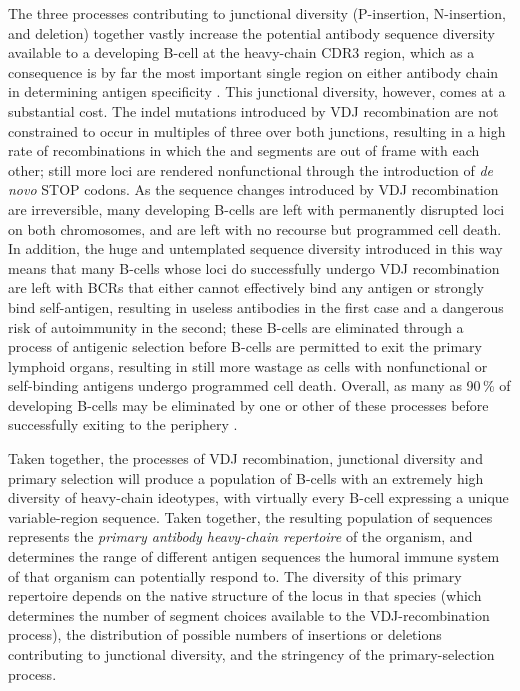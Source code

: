 The three processes contributing to junctional diversity (P-insertion, N-insertion, and deletion) together vastly increase the potential antibody sequence diversity available to a developing B-cell at the heavy-chain CDR3 region, which as a consequence is by far the most important single region on either antibody chain in determining antigen specificity \parencite{shirai1999h3}. This junctional diversity, however, comes at a substantial cost. The indel mutations introduced by VDJ recombination are not constrained to occur in multiples of three over both junctions, resulting in a high rate of recombinations in which the \vh and \jh segments are out of frame with each other; still more loci are rendered nonfunctional through the introduction of \textit{de novo} STOP codons. As the sequence changes introduced by VDJ recombination are irreversible, many developing B-cells are left with permanently disrupted \igh{} loci on both chromosomes, and are left with no recourse but programmed cell death. In addition, the huge and untemplated sequence diversity introduced in this way means that many B-cells whose \igh{} loci do successfully undergo VDJ recombination are left with BCRs that either cannot effectively bind any antigen or strongly bind self-antigen, resulting in useless antibodies in the first case and a dangerous risk of autoimmunity in the second; these B-cells are eliminated through a process of antigenic selection before \naive B-cells are permitted to exit the primary lymphoid organs, resulting in still more wastage as cells with nonfunctional or self-binding antigens undergo programmed cell death. Overall, as many as 90\,\% of developing B-cells may be eliminated by one or other of these processes before successfully exiting to the periphery \parencite{kogut2012bcells}.  

Taken together, the processes of VDJ recombination, junctional diversity and primary selection will produce a population of \naive B-cells with an extremely high diversity of heavy-chain ideotypes, with virtually every \naive B-cell expressing a unique variable-region sequence. Taken together, the resulting population of sequences represents the \textit{primary antibody heavy-chain repertoire} of the organism, and determines the range of different antigen sequences the humoral immune system of that organism can potentially respond to. The diversity of this primary repertoire depends on the native structure of the \igh{} locus in that species (which determines the number of segment choices available to the VDJ-recombination process), the distribution of possible numbers of insertions or deletions contributing to junctional diversity, and the stringency of the primary-selection process.

